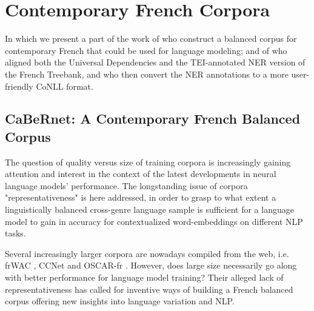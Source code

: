 \chapter{Contemporary French Corpora}

\begin{center}
    \begin{minipage}{0.66\textwidth}
        \begin{small}
            In which we present a part of the work of \citet{popa-fabre-etal-2020-french} who construct a balanced corpus for contemporary French that could be used for language modeling; and of \citet{ortiz-suarez-etal-2020-establishing} who aligned both the Universal Dependencies and the TEI-annotated NER version of the French Treebank, and who then convert the NER annotations to a more user-friendly CoNLL format.
        \end{small}
    \end{minipage}
    \vspace{0.5cm}
\end{center}


\section{CaBeRnet: A Contemporary French Balanced Corpus}
\label{sec:DescribeCorpora}

The question of quality versus size of training corpora is increasingly gaining attention and interest in the context of the latest developments in neural language models' performance.
The longstanding issue of corpora "representativeness" is here addressed, in order to grasp to what extent a linguistically balanced cross-genre language sample is sufficient for a language model to gain in accuracy for contextualized word-embeddings on different NLP tasks.

Several increasingly larger corpora are nowadays compiled from the web, i.e. frWAC \citep{baroni-etal-2009-the}, CCNet \citep{wenzek-etal-2020-ccnet} and OSCAR-fr \citep{ortiz-suarez-etal-2019-asynchronous}. However, does large size necessarily go along with better performance for language model training? Their alleged lack of representativeness has called for inventive ways of building a French balanced corpus offering new insights into language variation and NLP.

